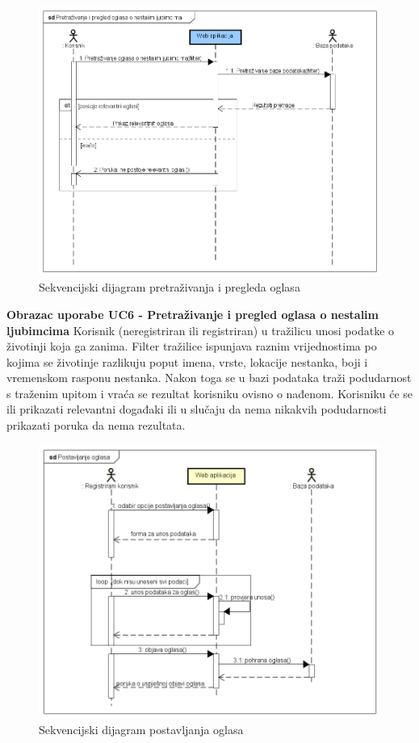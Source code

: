 			\begin{figure}[H]
				\includegraphics[scale=0.6]{slike/seq_pretrazivanje_pregled_oglasa.PNG} 
				\centering
				\caption{Sekvencijski dijagram pretraživanja i pregleda oglasa}
				\label{seq_pretrazivanje_pregled_oglasa}
			\end{figure}
			
			\noindent\textbf{Obrazac uporabe UC6 - Pretraživanje i pregled oglasa o nestalim ljubimcima}\newline
			\noindent Korisnik (neregistriran ili registriran) u tražilicu unosi podatke o životinji koja ga zanima. Filter tražilice ispunjava raznim vrijednostima po kojima se životinje razlikuju poput imena, vrste, lokacije nestanka, boji i vremenskom rasponu nestanka. Nakon toga se u bazi podataka traži podudarnost s traženim upitom i vraća se rezultat korisniku ovisno o nađenom. Korisniku će se ili prikazati relevantni događaki ili u slučaju da nema nikakvih podudarnosti prikazati poruka da nema rezultata.
			
			
			\begin{figure}[H]
				\includegraphics[scale=0.6]{slike/seq_postavljanje_oglasa.PNG} 
				\centering
				\caption{Sekvencijski dijagram postavljanja oglasa}
				\label{seq_postavljanje_oglasa}
			\end{figure}
			
